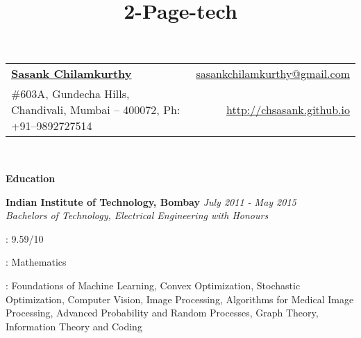 \documentclass[a4paper,10pt]{article}
\title{2-Page-tech}
\newcommand{\resheading}[1]{
	{\large \colorbox{mygrey}{\begin{minipage}{\textwidth}{\textbf{#1 \vphantom{p\^{E}}}}\end{minipage}}}
}
\newcommand{\ressubheadingWithGuide}[3]{%

	\textbf{#1} \hfill \textit{#2}\null\\
	\textit{\small #3} %
	\vspace{-4pt}
}
\begin{document}
\newcommand{\mywebheader}{
\begin{tabular*}{7in}{l@{\extracolsep{\fill}}r}
	\textbf{\href{http://home.iitb.ac.in/~sasank}{\LARGE Sasank Chilamkurthy}} & \href{mailto:sasankchilamkurthy@gmail.com}{sasankchilamkurthy@gmail.com}\\
	\#603A, Gundecha Hills, Chandivali, Mumbai -- 400072, Ph: +91--9892727514  & \href{http://home.iitb.ac.in/~sasank}{http://chsasank.github.io} \\
	\end{tabular*}
\\
\vspace{0.1in}}

\mywebheader

\resheading{Education}
	\ressubheadingWithGuide{Indian Institute of Technology, Bombay}{\textit{July 2011 - May 2015}}{Bachelors of Technology, Electrical Engineering with Honours}

				{ 
				\begin{description} \itemsep -1pt
					\item[CPI] : 9.59/10
					\item[Minor] : Mathematics
					\item[Key Courses] : Foundations of Machine Learning, Convex Optimization, Stochastic Optimization, Computer Vision, Image Processing, Algorithms for Medical Image Processing, Advanced Probability and Random Processes, Graph Theory, Information Theory and Coding
				\end{description}

				}

\end{document}
